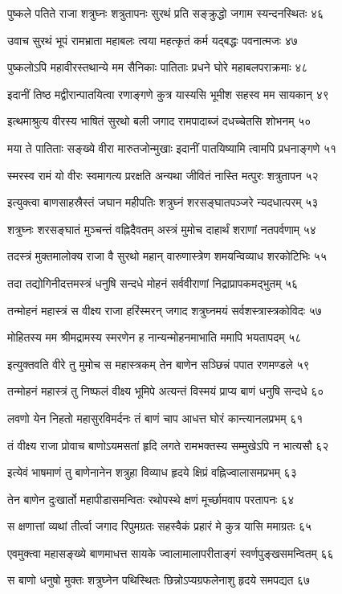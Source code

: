 पुष्कले पतिते राजा शत्रुघ्नः शत्रुतापनः
सुरथं प्रति सङ्क्रुद्धो जगाम स्यन्दनस्थितः ४६

उवाच सुरथं भूपं रामभ्राता महाबलः
त्वया महत्कृतं कर्म यद्बद्धः पवनात्मजः ४७

पुष्कलोऽपि महावीरस्तथान्ये मम सैनिकाः
पातिताः प्रधने घोरे महाबलपराक्रमाः ४८

इदानीं तिष्ठ मद्वीरान्पातयित्वा रणाङ्गणे
कुत्र यास्यसि भूमीश सहस्व मम सायकान् ४९

इत्थमाश्रुत्य वीरस्य भाषितं सुरथो बली
जगाद रामपादाब्जं दधच्चेतसि शोभनम् ५०

मया ते पातिताः सङ्ख्ये वीरा मारुतजोन्मुखाः
इदानीं पातयिष्यामि त्वामपि प्रधनाङ्गणे ५१

स्मरस्व रामं यो वीरः स्वमागत्य प्ररक्षति
अन्यथा जीवितं नास्ति मत्पुरः शत्रुतापन ५२

इत्युक्त्वा बाणसाहस्रैस्तं जघान महीपतिः
शत्रुघ्नं शरसङ्घातपञ्जरे न्यदधात्परम् ५३

शत्रुघ्नः शरसङ्घातं मुञ्चन्तं वह्निदैवतम्
अस्त्रं मुमोच दाहार्थं शराणां नतपर्वणाम् ५४

तदस्त्रं मुक्तमालोक्य राजा वै सुरथो महान्
वारुणास्त्रेण शमयन्विव्याध शरकोटिभिः ५५

तदा तद्योगिनीदत्तमस्त्रं धनुषि सन्दधे
मोहनं सर्ववीराणां निद्राप्रापकमद्भुतम् ५६

तन्मोहनं महास्त्रं स वीक्ष्य राजा हरिंस्मरन्
जगाद शत्रुघ्नमयं सर्वशस्त्रास्त्रकोविदः ५७

मोहितस्य मम श्रीमद्रामस्य स्मरणेन ह
नान्यन्मोहनमाभाति ममापि भयतापदम् ५८

इत्युक्तवति वीरे तु मुमोच स महास्त्रकम्
तेन बाणेन सञ्छिन्नं पपात रणमण्डले ५९

तन्मोहनं महास्त्रं तु निष्फलं वीक्ष्य भूमिपे
अत्यन्तं विस्मयं प्राप्य बाणं धनुषि सन्दधे ६०

लवणो येन निहतो महासुरविमर्दनः
तं बाणं चाप आधत्त घोरं कान्त्यानलप्रभम् ६१

तं वीक्ष्य राजा प्रोवाच बाणोऽयमसतां हृदि
लगते रामभक्तस्य सम्मुखेऽपि न भात्यसौ ६२

इत्येवं भाषमाणं तु बाणेनानेन शत्रुहा
विव्याध हृदये क्षिप्रं वह्निज्वालासमप्रभम् ६३

तेन बाणेन दुःखार्तो महापीडासमन्वितः
रथोपस्थे क्षणं मूर्च्छामवाप परतापनः ६४

स क्षणात्तां व्यथां तीर्त्वा जगाद रिपुमग्रतः
सहस्वैकं प्रहारं मे कुत्र यासि ममाग्रतः ६५

एवमुक्त्वा महासङ्ख्ये बाणमाधत्त सायके
ज्वालामालापरीताङ्गं स्वर्णपुङ्खसमन्वितम् ६६

स बाणो धनुषो मुक्तः शत्रुघ्नेन पथिस्थितः
छिन्नोऽप्यग्रफलेनाशु हृदये समपद्यत ६७

